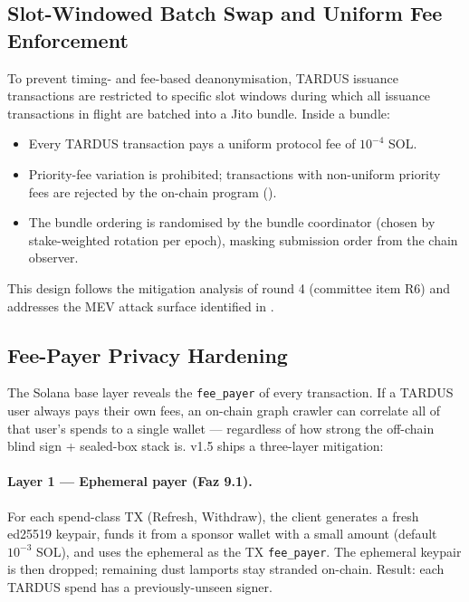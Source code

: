 \subsection{Slot-Windowed Batch Swap and Uniform Fee Enforcement}
\label{sec:mint-batch}

To prevent timing- and fee-based deanonymisation, TARDUS issuance transactions are restricted to specific slot windows during which all issuance transactions in flight are batched into a Jito bundle. Inside a bundle:

\begin{itemize}[leftmargin=2em,itemsep=0pt]
  \item Every TARDUS transaction pays a uniform protocol fee of $10^{-4}$ SOL.
  \item Priority-fee variation is prohibited; transactions with non-uniform priority fees are rejected by the on-chain program ().
  \item The bundle ordering is randomised by the bundle coordinator (chosen by stake-weighted rotation per epoch), masking submission order from the chain observer.
\end{itemize}

This design follows the mitigation analysis of round 4 (committee item R6) and addresses the MEV attack surface identified in .

\subsection{Fee-Payer Privacy Hardening}
\label{sec:mint-fee-payer-privacy}

The Solana base layer reveals the \texttt{fee\_payer} of every
transaction. If a TARDUS user always pays their own fees, an
on-chain graph crawler can correlate all of that user's spends to
a single wallet — regardless of how strong the off-chain blind sign
+ sealed-box stack is. v1.5 ships a three-layer mitigation:

\paragraph{Layer 1 — Ephemeral payer (Faz 9.1).} For each
spend-class TX (Refresh, Withdraw), the client generates a fresh
ed25519 keypair, funds it from a sponsor wallet with a small
amount (default $10^{-3}$ SOL), and uses the ephemeral as the TX
\texttt{fee\_payer}. The ephemeral keypair is then dropped;
remaining dust lamports stay stranded on-chain. Result: each
TARDUS spend has a previously-unseen signer.

